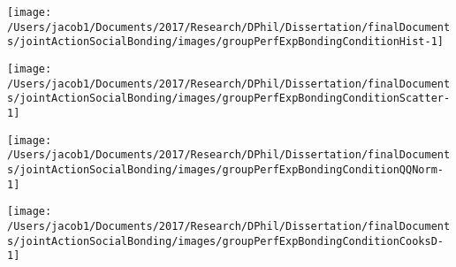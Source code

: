 \documentclass[english]{article}\usepackage[]{graphicx}\usepackage[]{color}
\makeatletter
\def\maxwidth{ %
  \ifdim\Gin@nat@width>\linewidth
    \linewidth
  \else
    \Gin@nat@width
  \fi
}
\newenvironment{kframe}{%
 \def\at@end@of@kframe{}%
 \ifinner\ifhmode%
  \def\at@end@of@kframe{\end{minipage}}%
  \begin{minipage}{\columnwidth}%
 \fi\fi%
 \def\FrameCommand##1{\hskip\@totalleftmargin \hskip-\fboxsep
 \colorbox{shadecolor}{##1}\hskip-\fboxsep
     \hskip-\linewidth \hskip-\@totalleftmargin \hskip\columnwidth}%
 \MakeFramed {\advance\hsize-\width
   \@totalleftmargin\z@ \linewidth\hsize
   \@setminipage}}%
 {\par\unskip\endMakeFramed%
 \at@end@of@kframe}
\newenvironment{knitrout}{}{} %
\makeatother
\begin{document}
\begin{knitrout}
\color{fgcolor}

{\centering \texttt{[image: /Users/jacob1/Documents/2017/Research/DPhil/Dissertation/finalDocuments/jointActionSocialBonding/images/groupPerfExpBondingConditionHist-1]} 

}



\end{knitrout}
\begin{knitrout}
\color{fgcolor}

{\centering \texttt{[image: /Users/jacob1/Documents/2017/Research/DPhil/Dissertation/finalDocuments/jointActionSocialBonding/images/groupPerfExpBondingConditionScatter-1]} 

}



\end{knitrout}
\begin{knitrout}
\color{fgcolor}

{\centering \texttt{[image: /Users/jacob1/Documents/2017/Research/DPhil/Dissertation/finalDocuments/jointActionSocialBonding/images/groupPerfExpBondingConditionQQNorm-1]} 

}



\end{knitrout}
\begin{knitrout}
\color{fgcolor}\begin{kframe}


{\ttfamily\noindent\color{warningcolor}{\#\# Warning in optwrap(optimizer, devfun, getStart(start, rho\$lower, rho\$pp), : convergence code 1 from optimx}}

{\ttfamily\noindent\color{warningcolor}{\#\# Warning in optwrap(optimizer, devfun, getStart(start, rho\$lower, rho\$pp), : convergence code 1 from optimx}}\end{kframe}

{\centering \texttt{[image: /Users/jacob1/Documents/2017/Research/DPhil/Dissertation/finalDocuments/jointActionSocialBonding/images/groupPerfExpBondingConditionCooksD-1]} 

}



\end{knitrout}
\end{document}
